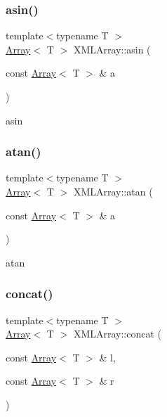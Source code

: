 \subsubsection{\texorpdfstring{asin()}{asin()}}
{\footnotesize\ttfamily template$<$typename T $>$ \\
\mbox{\hyperlink{classXMLArray_1_1Array}{Array}}$<$ T $>$ X\+M\+L\+Array\+::asin (\begin{DoxyParamCaption}\item[{const \mbox{\hyperlink{classXMLArray_1_1Array}{Array}}$<$ T $>$ \&}]{a }\end{DoxyParamCaption})\hspace{0.3cm}{\ttfamily [inline]}}



asin 

\mbox{\label{namespaceXMLArray_a961e9e4f133045c069214c97704aa349}} 
\subsubsection{\texorpdfstring{atan()}{atan()}}
{\footnotesize\ttfamily template$<$typename T $>$ \\
\mbox{\hyperlink{classXMLArray_1_1Array}{Array}}$<$ T $>$ X\+M\+L\+Array\+::atan (\begin{DoxyParamCaption}\item[{const \mbox{\hyperlink{classXMLArray_1_1Array}{Array}}$<$ T $>$ \&}]{a }\end{DoxyParamCaption})\hspace{0.3cm}{\ttfamily [inline]}}



atan 

\mbox{\label{namespaceXMLArray_af16029dd462356447ca4c8264203335a}} 
\subsubsection{\texorpdfstring{concat()}{concat()}}
{\footnotesize\ttfamily template$<$typename T $>$ \\
\mbox{\hyperlink{classXMLArray_1_1Array}{Array}}$<$ T $>$ X\+M\+L\+Array\+::concat (\begin{DoxyParamCaption}\item[{const \mbox{\hyperlink{classXMLArray_1_1Array}{Array}}$<$ T $>$ \&}]{l,  }\item[{const \mbox{\hyperlink{classXMLArray_1_1Array}{Array}}$<$ T $>$ \&}]{r }\end{DoxyParamCaption})\hspace{0.3cm}{\ttfamily [inline]}}




